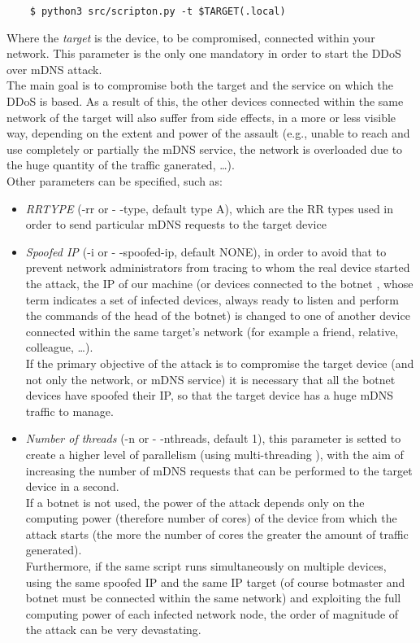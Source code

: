\documentclass[fleqn, 10pt]{SelfArx} %
\begin{document}
\begin{scriptsize}
	\begin{verbatim}
	$ python3 src/scripton.py -t $TARGET(.local) 
	\end{verbatim}
\end{scriptsize}

Where the {\it{target}} is the device, to be compromised, connected within your network.
This parameter is the only one mandatory in order to start the DDoS over mDNS attack.\\
The main goal is to compromise both the target and the service on which the DDoS is based. 
As a result of this, the other devices connected within the same network of the target will 
also suffer from side effects, in a more or less visible way, depending on the extent and power of the assault
(e.g., unable to reach and use completely or partially the mDNS service, the network is overloaded due to the huge quantity of the traffic ganerated, \dots).\\
Other parameters can be specified, such as:
\begin{itemize}[leftmargin=*]
    \item {\it{RRTYPE}} (-rr or - -type, default type A), which are the RR types used in order to send particular mDNS requests to the target device
    \item {\it{Spoofed IP} \cite{SPOOFING}} (-i or - -spoofed-ip, default NONE), in order to avoid that to prevent network administrators from tracing to whom the real device started the attack, 
	the IP of our machine (or devices connected to the botnet \cite{BOTNET}, whose term indicates a set of infected devices, always ready to listen and perform the commands of the head of the botnet) is changed to one of another device connected within the same target's network (for example a friend, relative, colleague, \dots).\\
	If the primary objective of the attack is to compromise the target device (and not only the network, or mDNS service) it is necessary that all the botnet devices have spoofed their IP, 
	so that the target device has a huge mDNS traffic to manage.
    \item {\it{Number of threads}} (-n or - -nthreads, default 1), this parameter is setted to create a higher level of parallelism (using multi-threading \cite{THREAD}), with the aim of increasing the number of mDNS requests that can be performed to the target device in a second. \\
    If a botnet is not used, the power of the attack depends only on the computing power (therefore number of cores) of the device from which the attack starts (the more the number of cores the greater the amount of traffic generated). \\
	Furthermore, if the same script runs simultaneously on multiple devices, using the same spoofed IP and the same IP target (of course botmaster and botnet must be connected within the same network) and exploiting the full computing power of each infected network node, the order of magnitude of the attack can be very devastating.
\end{itemize}
\end{document}
